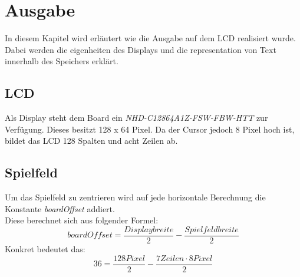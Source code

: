 \newpage
\section{Ausgabe}
    In diesem Kapitel wird erläutert wie die Ausgabe auf dem LCD realisiert wurde.
    Dabei werden die eigenheiten des Displays und die representation von Text innerhalb des Speichers erklärt.

    \subsection{LCD}
        Als Display steht dem Board ein \textit{NHD-C12864A1Z-FSW-FBW-HTT} zur Verfügung.
        Dieses besitzt 128 x 64 Pixel. Da der Cursor jedoch 8 Pixel hoch ist,
        bildet das LCD 128 Spalten und acht Zeilen ab.

    \subsection{Spielfeld}
        Um das Spielfeld zu zentrieren wird auf jede horizontale Berechnung die Konstante 
        \textit{boardOffset} addiert.\\
        Diese berechnet sich aus folgender Formel:
        \begin{equation}
            boardOffset = \dfrac{Displaybreite}{2} - \dfrac{Spielfeldbreite}{2}
        \end{equation}
        Konkret bedeutet das:
        \begin{equation}
            36 = \dfrac{128 Pixel}{2} - \dfrac{7 Zeilen \cdot 8 Pixel}{2}
        \end{equation}
        

